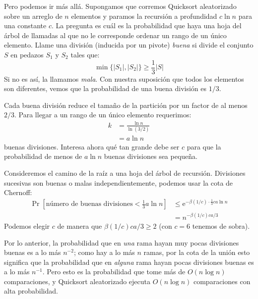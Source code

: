   Pero podemos ir más allá.
  Supongamos que corremos Quicksort aleatorizado
  sobre un arreglo de \(n\) elementos
  y paramos la recursión a profundidad \(c \ln n\) para una constante \(c\).
  La pregunta es cuál es la probabilidad
  que haya una hoja del árbol de llamadas
  al que no le corresponde ordenar un rango de un único elemento.
  Llame una división
  (inducida por un pivote)
  \emph{buena} si divide el conjunto \(S\) en pedazos \(S_1\) y \(S_2\)
  tales que:
  \begin{equation*}
    \min\{ \lvert S_1 \rvert, \lvert S_2 \rvert \}
      \ge \frac{1}{3} \lvert S \rvert
  \end{equation*}
  Si no es así,
  la llamamos \emph{mala}.
  Con nuestra suposición que todos los elementos son diferentes,
  vemos que la probabilidad de una buena división es \(1/3\).

  Cada buena división reduce el tamaño de la partición
  por un factor de al menos \(2/3\).
  Para llegar a un rango de un único elemento requerimos:
  \begin{align*}
    k
      &= \frac{\ln n}{\ln (3/2)} \\
      &= a \ln n
  \end{align*}
  buenas divisiones.
  Interesa ahora qué tan grande debe ser \(c\)
  para que la probabilidad de menos de \(a \ln n\) buenas divisiones
  sea pequeña.

  Consideremos el camino de la raíz a una hoja del árbol de recursión.
  Divisiones sucesivas son buenas o malas independientemente,
  podemos usar la cota de Chernoff:
  \begin{align*}
    \Pr\left[
         \text{número de buenas divisiones}
            < \frac{1}{3} a \ln n
        \right]
      &\le \mathrm{e}^{- \beta(1 / c) \cdot \frac{1}{3} c a \ln n} \\
      &= n^{- \beta(1 / c) c a / 3}
  \end{align*}
  Podemos elegir \(c\) de manera que \(\beta(1 / c) c a / 3 \ge 2\)
  (con \(c = 6\) tenemos de sobra).

  Por lo anterior,
  la probabilidad que en \emph{una} rama
  hayan muy pocas divisiones buenas es a lo más \(n^{-2}\);
  como hay a lo más \(n\) ramas,
  por la cota de la unión
  esto significa que la probabilidad
  que en \emph{alguna} rama hayan pocas divisiones buenas
  es a lo más \(n^{-1}\).
  Pero esto es la probabilidad que tome más de \(O(n \log n)\) comparaciones,
  y Quicksort aleatorizado ejecuta \(O(n \log n)\) comparaciones
  con alta probabilidad.

